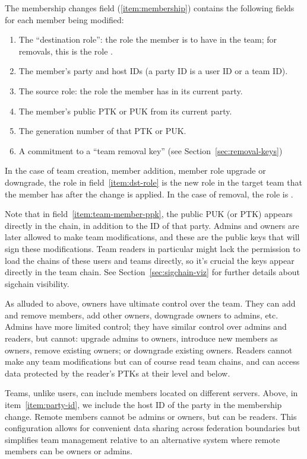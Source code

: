 The membership changes field (\ref{item:membership}) contains the following
fields for each member being modified:

\begin{enumerate}[label=M.\arabic*]\itemsep0em
    \item The ``destination role'': the role the member is to have in the team; for removals,
      this is the role \none .
      \label{item:dst-role}
    \item The member's party and host IDs (a party ID is a user ID or a team ID).
      \label{item:party-id}
    \item The source role: the role the member has in its current party.
    \item The member's public PTK or PUK from its current party.
      \label{item:team-member-ppk}
    \item The generation number of that PTK or PUK.
    \item A commitment to a ``team removal key'' (see Section~\ref{sec:removal-keys})
\end{enumerate}

In the case of team creation, member addition, member role upgrade or downgrade, the
role in field~\ref{item:dst-role} is the new role in the target team that the member
has after the change is applied.  In the case of removal, the role is \none. 

Note that in field~\ref{item:team-member-ppk}, the public PUK (or PTK) appears directly
in the chain, in addition to the ID of that party. Admins and owners are later allowed to
make team modifications, and these are the public keys that will sign these modifications.
Team readers in particular might lack the permission to load the chains of these users
and teams directly, so it's crucial the keys appear directly in the team chain. 
See Section~\ref{sec:sigchain-viz} for further details about sigchain visibility.

As alluded to above, owners have ultimate control over the team. They can add and remove
members, add other owners, downgrade owners to admins, etc. Admins have more limited 
control; they have similar control over admins and readers, but cannot: upgrade admins
to owners, introduce new members as owners, remove existing owners; or downgrade 
existing owners. Readers cannot make any team modifications but can of course read
team chains, and can access data protected by the reader's PTKs at their level
and below.

Teams, unlike users, can include members located on different servers. Above, in 
item~\ref{item:party-id}, we include the host ID of the party in the membership change.
Remote members cannot be admins or owners, but can be readers. This configuration allows
for convenient data sharing across federation boundaries but simplifies team management
relative to an alternative system where remote members can be owners or admins.

